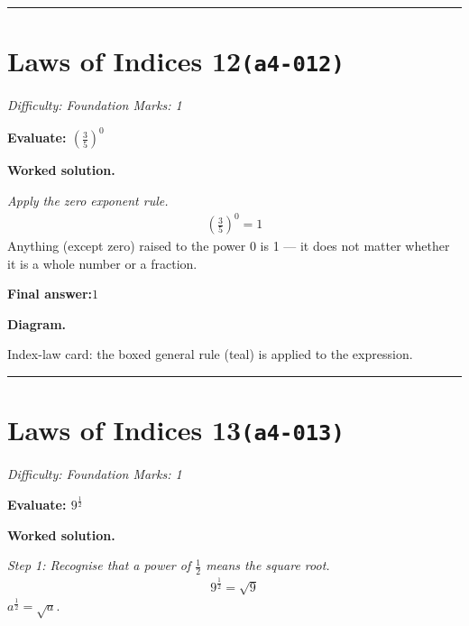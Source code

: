 \documentclass[11pt]{article}
\newcommand{\question}[1]{\par\medskip\noindent\textbf{#1}\par}
\begin{document}
\medskip\hrule

\section*{Laws of Indices 12\quad\small\texttt{(a4-012)}}
\textit{Difficulty: Foundation \quad\textbar\quad Marks: 1}

\question{Evaluate: \( \left(\frac{3}{5}\right)^0 \)}

\textbf{Worked solution.}

\textit{Apply the zero exponent rule.}
\[\begin{gathered}
\left(\frac{3}{5}\right)^0 = 1
\end{gathered}\]
Anything (except zero) raised to the power 0 is 1 — it does not matter whether it is a whole number or a fraction.

\begin{answerbox}
\textbf{Final answer:}\quad \(\displaystyle 1\)
\end{answerbox}
\textbf{Diagram.}

\begin{center}
\end{center}
\small Index-law card: the boxed general rule (teal) is applied to the expression.\normalsize

\medskip\hrule

\section*{Laws of Indices 13\quad\small\texttt{(a4-013)}}
\textit{Difficulty: Foundation \quad\textbar\quad Marks: 1}

\question{Evaluate: \( 9^{\frac{1}{2}} \)}

\textbf{Worked solution.}

\textit{Step 1: Recognise that a power of \( \frac{1}{2} \) means the square root.}
\[\begin{gathered}
9^{\frac{1}{2}} = \sqrt{9}
\end{gathered}\]
\( a^{\frac{1}{2}} = \sqrt{a} \).
\end{document}
